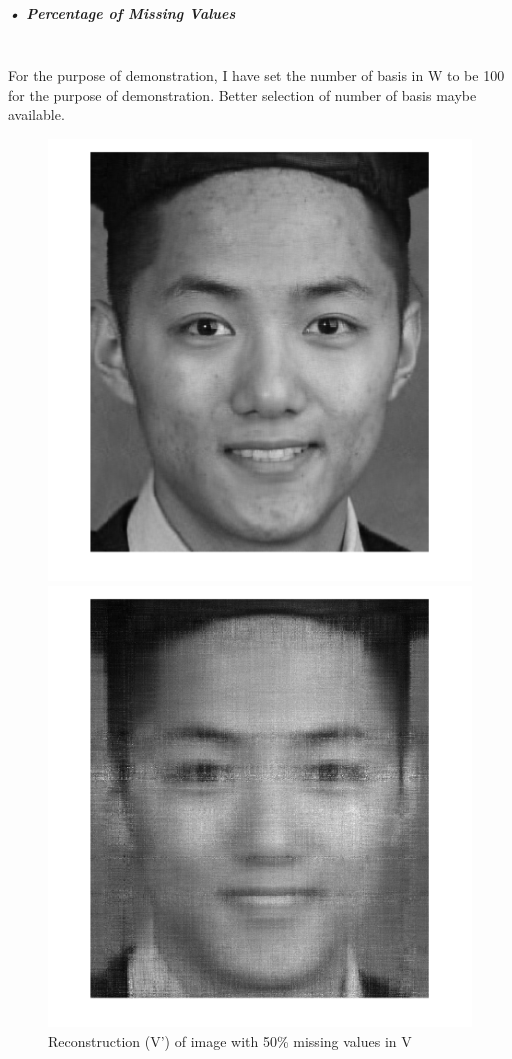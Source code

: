 \documentclass[11pt]{article} %
\begin{document}
\subparagraph{• Percentage of Missing Values}\mbox{}\\
For the purpose of demonstration, I have set the number of basis in W to be 100 for the purpose of demonstration. Better selection of number of basis maybe available.
\begin{figure}[H]
  \includegraphics[width=\linewidth]{mySelfie50M100R.png}
  \caption{Reconstruction (V') of image with 50\% missing values in V}\label{fig:awesome_image1}
\endminipage\hfill
{}
  \includegraphics[width=\linewidth]{mySelfie90M100R.png}

\end{figure}
\end{document}
